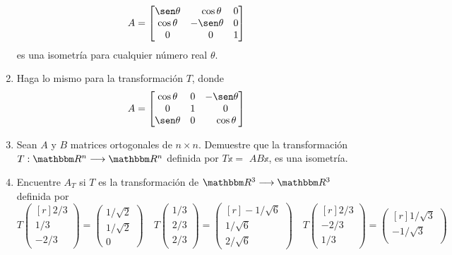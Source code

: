 \begin{enumerate}[start=27]
    $$A = \begin{bmatrix}
        \sen \theta & \phantom{-}\cos \theta & 0 \\
        \cos \theta & -\sen \theta & 0 \\
        0 & \phantom{-}0 & 1
    \end{bmatrix}$$
    es una isometría para cualquier número real $\theta$.\newpage
    \item Haga lo mismo para la transformación $T$, donde
    $$A = \begin{bmatrix}
        \cos \theta & 0 & -\sen \theta \\
        0 & 1 & \phantom{-} 0 \\
        \sen \theta & 0 & \phantom{-} \cos \theta
    \end{bmatrix}$$
    \item Sean $A$ y $B$ matrices ortogonales de $n \times n$. Demuestre que la transformación $T: \RR[n] \longrightarrow \RR[n]$ definida por $T \mathbb{x}=$ $A B \mathbb{x}$, es una isometría.
    \item Encuentre $A_{T}$ si $T$ es la transformación de $\RR[3] \longrightarrow \RR[3]$ definida por
    $$T\begin{pmatrix*}[r]
        2/3 \\
        1/3 \\
        -2/3
    \end{pmatrix*} = \begin{pmatrix}
        1/\sqrt{2} \\
        1/\sqrt{2} \\
        0
    \end{pmatrix} \quad T\begin{pmatrix}
        1/3 \\
        2/3 \\
        2/3
    \end{pmatrix} = \begin{pmatrix*}[r]
        -1/\sqrt{6} \\
        1/\sqrt{6} \\
        2/\sqrt{6}
    \end{pmatrix*} \quad T\begin{pmatrix*}[r]
        2/3 \\
        -2/3 \\
        1/3
    \end{pmatrix*} = \begin{pmatrix*}[r]
        1/\sqrt{3} \\
        -1/\sqrt{3} \\

\end{pmatrix*}$$
\end{enumerate}
